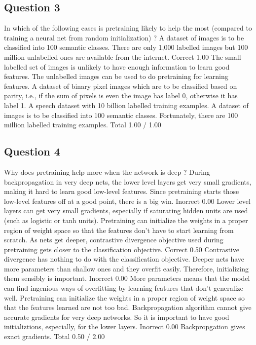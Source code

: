\subsection*{Question 3}
In which of the following cases is pretraining likely to help the most (compared to training a neural net from random initialization) ?
A dataset of images is to be classified into 100 semantic classes. There are only 1,000 labelled images but 100 million unlabelled ones are available from the internet.	Correct	1.00	The small labelled set of images is unlikely to have enough information to learn good features. The unlabelled images can be used to do pretraining for learning features.
A dataset of binary pixel images which are to be classified based on parity, i.e., if the sum of pixels is even the image has label 0, otherwise it has label 1.			
A speech dataset with 10 billion labelled training examples.			
A dataset of images is to be classified into 100 semantic classes. Fortunately, there are 100 million labelled training examples.			
Total		1.00 / 1.00	
\subsection*{Question 4}
Why does pretraining help more when the network is deep ?
During backpropagation in very deep nets, the lower level layers get very small gradients, making it hard to learn good low-level features. Since pretraining starts those low-level features off at a good point, there is a big win.	Inorrect	0.00	Lower level layers can get very small gradients, especially if saturating hidden units are used (such as logistic or tanh units). Pretraining can initialize the weights in a proper region of weight space so that the features don't have to start learning from scratch.
As nets get deeper, contrastive divergence objective used during pretraining gets closer to the classification objective.	Correct	0.50	Contrastive divergence has nothing to do with the classification objective.
Deeper nets have more parameters than shallow ones and they overfit easily. Therefore, initializing them sensibly is important.	Inorrect	0.00	More parameters means that the model can find ingenious ways of overfitting by learning features that don't generalize well. Pretraining can initialize the weights in a proper region of weight space so that the features learned are not too bad.
Backpropagation algorithm cannot give accurate gradients for very deep networks. So it is important to have good initializtions, especially, for the lower layers.	Inorrect	0.00	Backpropgation gives exact gradients.
Total		0.50 / 2.00	
